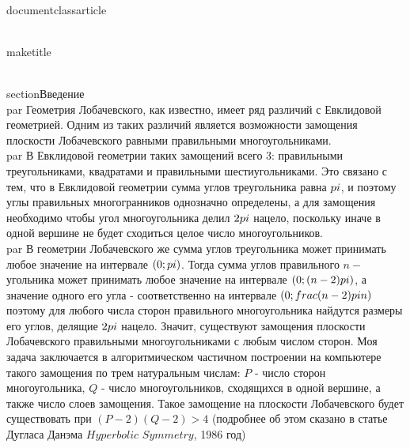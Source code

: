 \\documentclass{article}
\begin{document}
\\maketitle

\\section{Введение}
\\par Геометрия Лобачевского, как известно, имеет ряд различий с Евклидовой геометрией. Одним из таких различий является возможности замощения плоскости Лобачевского равными правильными многоугольниками. 
\\par В Евклидовой геометрии таких замощений всего 3: правильными треугольниками, квадратами и правильными шестиугольниками. Это связано с тем, что в Евклидовой геометрии сумма углов треугольника равна $\\pi$, и поэтому углы правильных многогранников однозначно определены, а для замощения необходимо чтобы угол многоугольника делил $2\\pi$ нацело, поскольку иначе в одной вершине не будет сходиться целое число многоугольников. 
\\par В геометрии Лобачевского же сумма углов треугольника может принимать любое значение на интервале $(0; \\pi)$. Тогда сумма углов правильного $n-$угольника может принимать любое значение на интервале $(0; (n - 2)\\pi)$, а значение одного его угла - соответственно на интервале $(0; \\frac{(n - 2)\\pi}{n})$ поэтому для любого числа сторон правильного многоугольника найдутся размеры его углов, делящие $2\\pi$ нацело.  Значит, существуют замощения плоскости Лобачевского правильными многоугольниками с любым числом сторон. Моя задача заключается в алгоритмическом частичном построении на компьютере такого замощения по трем натуральным числам: $P$ - число сторон многоугольника, $Q$ - число многоугольников, сходящихся в одной вершине, а также число слоев замощения. Такое замощение на плоскости Лобачевского будет существовать при $(P-2)(Q-2) > 4$ (подробнее об этом сказано в статье Дугласа Данэма $Hyperbolic$ $Symmetry$, 1986 год)
\end{document}
